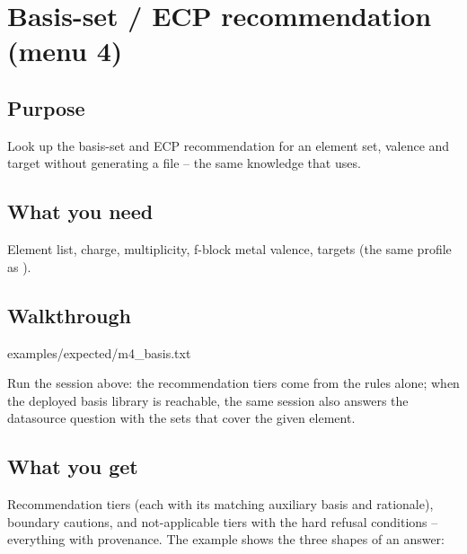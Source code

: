 \chapter{Basis-set / ECP recommendation (menu 4)}
\label{ch:menu4}

\section{Purpose}

Look up the basis-set and ECP recommendation for an element set, valence and
target without generating a file -- the same knowledge that  uses.

\section{What you need}

Element list, charge, multiplicity, f-block metal valence, targets (the same
profile as ).

\section{Walkthrough}


  {examples/expected/m4_basis.txt}

Run the session above: the recommendation tiers come from the rules alone;
when the deployed basis library is reachable, the same session also answers
the datasource question with the sets that cover the given element.

\section{What you get}

Recommendation tiers (each with its matching auxiliary basis and rationale),
boundary cautions, and not-applicable tiers with the hard refusal conditions --
everything with provenance. The example shows the three shapes of an answer:

